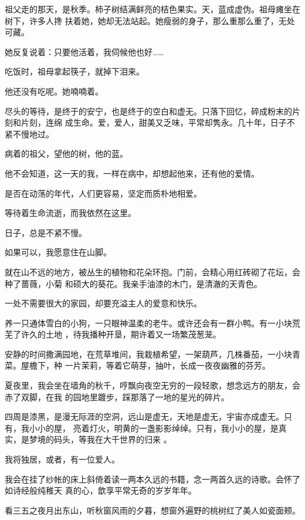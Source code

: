 \documentclass[12pt,a4paper]{article}
\begin{document}
		祖父走的那天，是秋季。柿子树结满鲜亮的桔色果实。天，蓝成虚伪。祖母瘫坐在树下，许多人搀
	扶着她，她却无法站起。她瘦弱的身子，那么重那么重了，无处可藏。

		她反复说着：只要他活着，我伺候他也好……\par
		吃饭时，祖母拿起筷子，就掉下泪来。\par
		他还没有吃呢。她喃喃着。

		尽头的等待，是终于的安宁，也是终于的空白和虚无。只落下回忆，碎成粉末的片刻和片刻，连绵
	成生命。爱，爱人，甜美又乏味，平常却隽永。几十年，日子不紧不慢地过。

		病着的祖父，望他的树，他的蓝。\par
		他不会知道，这一天的我，一样在病中，却想起他来，还有他的爱情。\par
		是否在动荡的年代，人们更容易，坚定而质朴地相爱。\par
		等待着生命流逝，而我依然在这里。\par
		日子，总是不紧不慢。

	\endwriting



		如果可以，我愿意住在山脚。

		就在山不远的地方，被丛生的植物和花朵环抱。门前，会精心用红砖砌了花坛，会种了蔷薇，小菊
	和硕大的葵花。我亲手油漆的木门，是清澈的天青色。

		一处不需要很大的家园，却要充溢主人的爱意和快乐。

		养一只通体雪白的小狗，一只眼神温柔的老牛。或许还会有一群小鸭。有一小块荒芜了许久的土地
	，待我播种开垦，期许着又一场繁茂葱茏。

		安静的时间撒满园地，在荒草堆间，我栽植希望，一架葫芦，几株番茄，一小块青菜。屋檐下，种
	一片茉莉，等着它萌芽，抽叶，长成一夜夜幽雅的芬芳。

		夏夜里，我会坐在墙角的秋千，哼飘向夜空无穷的一段轻歌，想念远方的朋友，会赤了双脚，在我
	的园地里踱步，踩那落了一地的星光的碎片。

		四周是漆黑，是漫无际涯的空洞，远山是虚无，天地是虚无，宇宙亦成虚无。只有，我小小的屋，
	亮着灯火，明黄的一盏影影绰绰。只有，我小小的屋，是真实，是梦境的码头，等我在大千世界的归来
	。

		我将独居，或者，有一位爱人。

		我会在挂了纱帐的床上斜倚着读一两本久远的书籍，念一两首久远的诗歌。会怀了如诗经般纯稚天
	真的心，歆享平常无奇的岁岁年年。

		看三五之夜月出东山，听秋窗风雨的夕暮，想窗外遍野的桃树红了美人如瓷面颊。
\end{document}
